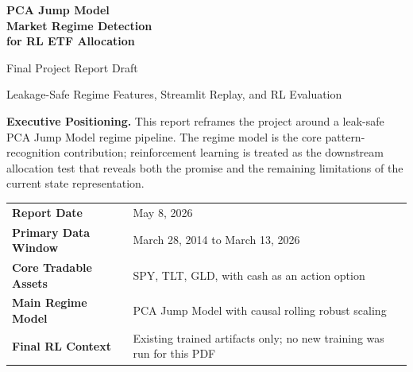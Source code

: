 \documentclass[11pt,a4paper]{article}
\begin{document}
\hypersetup{pageanchor=false}
\begin{titlepage}

\vspace*{1.4cm}

{\color{white}\sffamily\bfseries\fontsize{24}{28}\selectfont
PCA Jump Model\\[0.12em]
Market Regime Detection\\[0.12em]
for RL ETF Allocation\par}

\vspace{0.8cm}

{\color{white}\Large\sffamily Final Project Report Draft\par}

\vspace{0.6cm}

{\color{white}\large\sffamily Leakage-Safe Regime Features, Streamlit Replay, and RL Evaluation\par}

\vspace{1.3cm}

\begin{summarybox}[width=\textwidth,colback=white,colframe=white]
\textbf{\color{navy}Executive Positioning.}
This report reframes the project around a leak-safe PCA Jump Model regime pipeline.
The regime model is the core pattern-recognition contribution; reinforcement
learning is treated as the downstream allocation test that reveals both the
promise and the remaining limitations of the current state representation.
\end{summarybox}

\vspace{0.5cm}

\begin{tabularx}{\textwidth}{@{}P{0.24\textwidth}Y@{}}
\textbf{\color{navy}Report Date} & May 8, 2026 \\
\textbf{\color{navy}Primary Data Window} & March 28, 2014 to March 13, 2026 \\
\textbf{\color{navy}Core Tradable Assets} & SPY, TLT, GLD, with cash as an action option \\
\textbf{\color{navy}Main Regime Model} & PCA Jump Model with causal rolling robust scaling \\
\textbf{\color{navy}Final RL Context} & Existing trained artifacts only; no new training was run for this PDF \\
\end{tabularx}


\end{titlepage}
\end{document}
